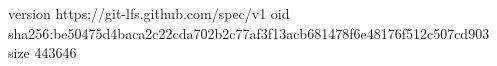version https://git-lfs.github.com/spec/v1
oid sha256:be50475d4baca2c22cda702b2c77af3f13acb681478f6e48176f512c507cd903
size 443646
